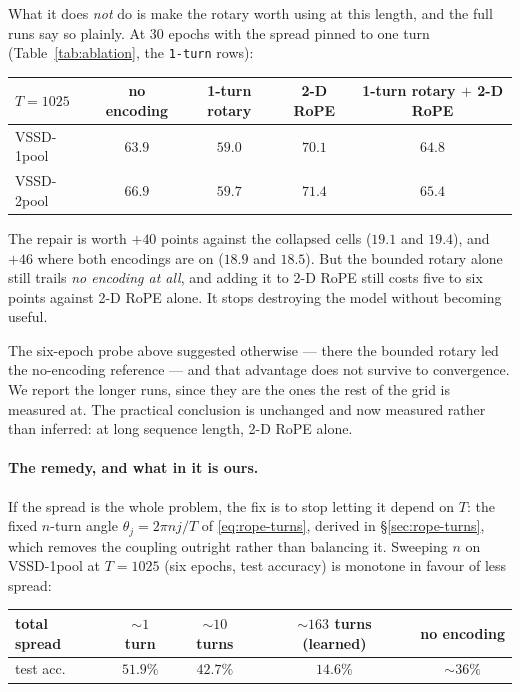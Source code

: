 \documentclass[11pt,a4paper]{article}
\begin{document}
What it does \emph{not} do is make the rotary worth using at this length, and the
full runs say so plainly. At $30$ epochs with the spread pinned to one turn
(Table~\ref{tab:ablation}, the \texttt{1-turn} rows):
\begin{center}\small
\begin{tabular}{|l|cc|cc|}
\hline
$T{=}1025$ & no encoding & 1-turn rotary & 2-D RoPE & 1-turn rotary $+$ 2-D RoPE \\ \hline
VSSD-1pool & $63.9$ & $59.0$ & $\mathbf{70.1}$ & $64.8$ \\ \hline
VSSD-2pool & $66.9$ & $59.7$ & $\mathbf{71.4}$ & $65.4$ \\ \hline
\end{tabular}
\end{center}
The repair is worth $+40$ points against the collapsed cells ($19.1$ and $19.4$),
and $+46$ where both encodings are on ($18.9$ and $18.5$). But the bounded rotary
alone still trails \emph{no encoding at all}, and adding it to 2-D RoPE still costs
five to six points against 2-D RoPE alone. It stops destroying the model without
becoming useful.

The six-epoch probe above suggested otherwise --- there the bounded rotary led the
no-encoding reference --- and that advantage does not survive to convergence. We
report the longer runs, since they are the ones the rest of the grid is measured at.
The practical conclusion is unchanged and now measured rather than inferred: at long
sequence length, 2-D RoPE alone.

\paragraph{The remedy, and what in it is ours.}
If the spread is the whole problem, the fix is to stop letting it depend on $T$: the fixed
$n$-turn angle $\theta_j=2\pi n j/T$ of \eqref{eq:rope-turns}, derived in
\S\ref{sec:rope-turns}, which removes the coupling outright rather than balancing it.
Sweeping $n$ on VSSD-1pool at $T{=}1025$ (six epochs, test accuracy) is monotone in
favour of less spread:
\begin{center}\small
\begin{tabular}{|l|c|c|c|c|}
\hline
total spread & $\sim$$1$ turn & $\sim$$10$ turns & $\sim$$163$ turns (learned) & no encoding \\ \hline
test acc. & $\mathbf{51.9\%}$ & $42.7\%$ & $14.6\%$ & $\sim$$36\%$ \\ \hline
\end{tabular}
\end{center}
\end{document}
